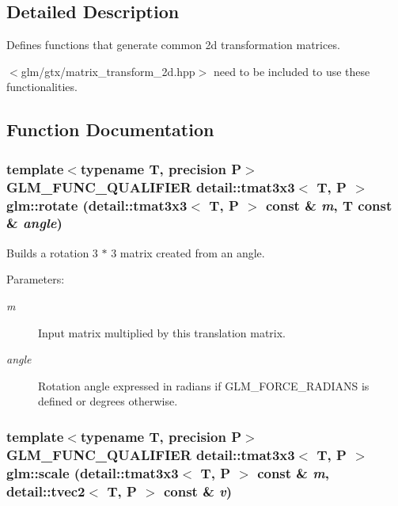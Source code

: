 \subsection{Detailed Description}
Defines functions that generate common 2d transformation matrices. 

$<$glm/gtx/matrix\_\-transform\_\-2d.hpp$>$ need to be included to use these functionalities. 

\subsection{Function Documentation}
\hypertarget{group__gtx__matrix__transform__2d_gcfd972a1747f367837d62e00be5d841e}{
\subsubsection[rotate]{\setlength{\rightskip}{0pt plus 5cm}template$<$typename T, precision P$>$ GLM\_\-FUNC\_\-QUALIFIER detail::tmat3x3$<$ T, P $>$ glm::rotate (detail::tmat3x3$<$ T, P $>$ const \& {\em m}, \/  T const \& {\em angle})}}
\label{group__gtx__matrix__transform__2d_gcfd972a1747f367837d62e00be5d841e}


Builds a rotation 3 $\ast$ 3 matrix created from an angle.

\begin{Desc}
\item[Parameters:]
\begin{description}
\item[{\em m}]Input matrix multiplied by this translation matrix. \item[{\em angle}]Rotation angle expressed in radians if GLM\_\-FORCE\_\-RADIANS is defined or degrees otherwise. \end{description}
\end{Desc}
\hypertarget{group__gtx__matrix__transform__2d_g275b188a11797f386aeda153a17afcdc}{
\subsubsection[scale]{\setlength{\rightskip}{0pt plus 5cm}template$<$typename T, precision P$>$ GLM\_\-FUNC\_\-QUALIFIER detail::tmat3x3$<$ T, P $>$ glm::scale (detail::tmat3x3$<$ T, P $>$ const \& {\em m}, \/  detail::tvec2$<$ T, P $>$ const \& {\em v})}}
\label{group__gtx__matrix__transform__2d_g275b188a11797f386aeda153a17afcdc}


